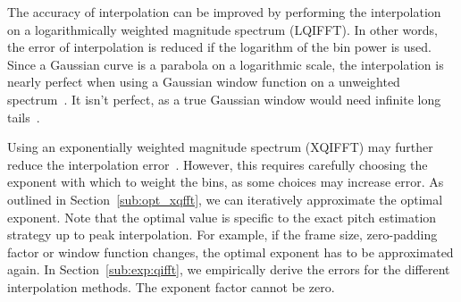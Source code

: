 \documentclass[a4paper,10pt,twocolumn]{article}
\begin{document}
The accuracy of interpolation can be improved by performing the interpolation on a logarithmically weighted magnitude spectrum (LQIFFT). In other words, the error of interpolation is reduced if the logarithm of the bin power is used. Since a Gaussian curve is a parabola on a logarithmic scale, the interpolation is nearly perfect when using a Gaussian window function on a unweighted spectrum~\cite{interpolgaus}. It isn't perfect, as a true Gaussian window would need infinite long tails~\cite{gauswin}.

Using an exponentially weighted magnitude spectrum (XQIFFT) may further reduce the interpolation error~\cite{interpolnozero}. However, this requires carefully choosing the exponent with which to weight the bins, as some choices may increase error. As outlined in Section~\ref{sub:opt_xqfft}, we can iteratively approximate the optimal exponent. Note that the optimal value is specific to the exact pitch estimation strategy up to peak interpolation. For example, if the frame size, zero-padding factor or window function changes, the optimal exponent has to be approximated again. In Section~\ref{sub:exp:qifft}, we empirically derive the errors for the different interpolation methods. The exponent factor cannot be zero.
\end{document}
